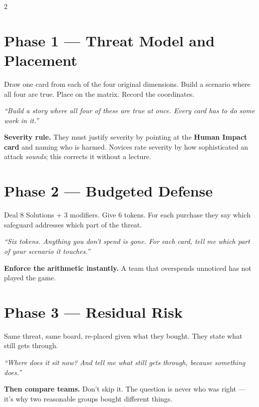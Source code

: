 \documentclass[9pt,letterpaper]{extarticle}
\newcommand{\say}[1]{\textit{``#1''}}
\begin{document}
\begin{multicols}{2}
\columnbreak

\section{Phase 1 --- Threat Model and Placement}
Draw one card from each of the four original dimensions. Build a scenario where
all four are true. Place on the matrix. Record the coordinates.

\vspace{0.3em}
\say{Build a story where all four of these are true at once. Every card has to
do some work in it.}

\vspace{0.3em}
\textbf{Severity rule.} They must justify severity by pointing at the
\textbf{Human Impact card} and naming who is harmed. Novices rate severity by
how sophisticated an attack \emph{sounds}; this corrects it without a lecture.

\section{Phase 2 --- Budgeted Defense}
Deal 8 Solutions + 3 modifiers. Give 6 tokens. For each purchase they say which
safeguard addresses which part of the threat.

\vspace{0.3em}
\say{Six tokens. Anything you don't spend is gone. For each card, tell me which
part of your scenario it touches.}

\vspace{0.3em}
\textbf{Enforce the arithmetic instantly.} A team that overspends unnoticed has
not played the game.

\section{Phase 3 --- Residual Risk}
Same threat, same board, re-placed given what they bought. They state what still
gets through.

\vspace{0.3em}
\say{Where does it sit now? And tell me what still gets through, because
something does.}

\vspace{0.3em}
\textbf{Then compare teams.} Don't skip it. The question is never who was right
--- it's why two reasonable groups bought different things.

\end{multicols}
\end{document}
